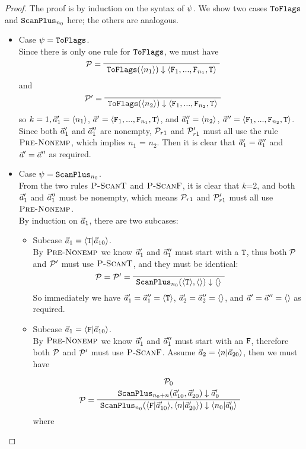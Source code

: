 \begin{proof}
	The proof is by induction on the syntax of $\psi$. We show two cases $\mathtt{ToFlags}$ and $\mathtt{ScanPlus}_{n_0}$ here; the others are analogous.
	\begin{itemize}
	  \item Case $\psi = \mathtt{ToFlags}$. \\
	  
		Since there is only one rule for $\mathtt{ToFlags}$, we must have
		$$	\PT{\LeLa{\MP =} 
			\Axiom{\blockf{\toflag}{\singl{n_1}}{\< \F_1,...,\F_{n_1},\T \'>}} }
		$$
		and 
			$$	\PT{\LeLa{\MP' =} 
			\Axiom{\blockf{\toflag}{\singl{n_2}}{\< \F_1,...,\F_{n_2},\T \'>}} }
		$$
		so $k=1, \vec a_1' = \langle n_1 \rangle$, $\a' = \< \F_1,...,\F_{n_1},\T \'>$, and  
	     $\vec a_1'' = \langle n_2 \rangle$, $\a'' = \< \F_1,...,\F_{n_2},\T \'>$. \\
		Since both $\vec a_1'$ and $\vec a_1''$ are nonempty, $\mathcal{P}_{r1}$ and $\mathcal{P}_{r1}'$ must all use the rule $\textsc{Pre-Nonemp}$,
		which implies $n_1$ = $n_2$. 
		Then it is clear that $\vec a_1' = \vec a_1''$ and $\vec a' = \vec a''$ as required. 

	  \item Case $\psi = \mathtt{ScanPlus}_{n_0}$. \\
	  From the two rules $\textsc{P-ScanT}$ and $\textsc{P-ScanF}$, it is clear that $k$=2, and both $\vec a_1'$ and $\vec a''_1$ must be nonempty, which means $\mathcal{P}_{r1}$ and $\mathcal{P}_{r1}'$ must all use $\textsc{Pre-Nonemp}$. \\
	  By induction on $\vec a_1$, there are two subcases:
	  \begin{itemize}
	  	\item Subcase $\a_1 = \< \T | \a_{10} \'>$. \\
	  	By $\textsc{Pre-Nonemp}$ we know $\vec a_1'$ and $\vec a_1''$ must start with a $\mathtt{T}$, thus both $\mathcal{P}$ and $\mathcal{P}'$ must use $\textsc{P-ScanT}$, and they must be identical:
	  	$$
	  	  \PT{\LeLa{\MP = \MP' = } \Axiom{\blockf{\scan_{n_0}}{\oT, \emptyv}{\emptyv}}}$$
	  	 So immediately we have $\vec a'_{1} = \vec a_1'' = \langle \mathtt{T} \rangle$, $\vec a_2' = \vec a_2'' = \langle \rangle$,
	  	 and $\vec a' = \vec a'' = \langle \rangle$ as required.
	  	
	  	\item Subcase $\a_1 = \< \F | \a_{10} \'>$. \\
	  	By $\textsc{Pre-Nonemp}$ we know $\vec a_1'$ and $\vec a_1''$ must start with an $\mathtt{F}$, therefore both $\mathcal{P}$ and $\mathcal{P}'$ must use $\textsc{P-ScanF}$. 
	  	Assume $\a_2 = \<n | \a_{20} \'>$, then we must have
	  	
	  	$$\PT{\UCN{\MP_0}{\blockf{\scan_{n_0+n}}{\a'_{10},\a'_{20}}{\a_0'}}
	  		\LeLa{\MP = }
	  		\UC{\blockf{\scan_{n_0}}{\<\F|\a'_{10} \'>, \<n|\a'_{20}\'>}{\<n_0|\a'_0\'>}}
	  	}$$
  	    where 
  	

\end{itemize}
\end{itemize}
\end{proof}
